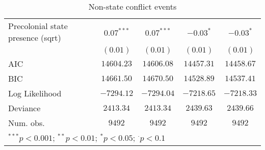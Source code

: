 \begin{sidewaystable}
\begin{center}
{\begin{tabular}{l c c c c}
Precolonial state presence (sqrt)     & $0.07^{***}$  & $0.07^{***}$  & $-0.03^{*}$   & $-0.03^{*}$   \\
                                      & $(0.01)$      & $(0.01)$      & $(0.01)$      & $(0.01)$      \\
\midrule
AIC                                   & $14604.23$    & $14606.08$    & $14457.31$    & $14458.67$    \\
BIC                                   & $14661.50$    & $14670.50$    & $14528.89$    & $14537.41$    \\
Log Likelihood                        & $-7294.12$    & $-7294.04$    & $-7218.65$    & $-7218.33$    \\
Deviance                              & $2413.34$     & $2413.34$     & $2439.63$     & $2439.66$     \\
Num. obs.                             & $9492$        & $9492$        & $9492$        & $9492$        \\
\bottomrule
\multicolumn{5}{l}{\scriptsize{$^{***}p<0.001$; $^{**}p<0.01$; $^{*}p<0.05$; $^{\cdot}p<0.1$}}
\end{tabular}
}
\caption{Non-state conflict events}
\label{non_state}
\end{center}
\end{sidewaystable}
